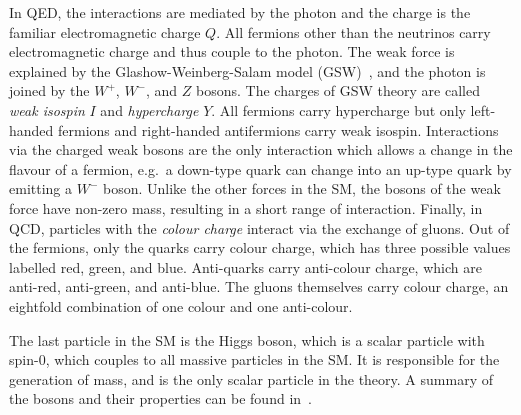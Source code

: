 In QED, the interactions are mediated by the photon and the charge is the familiar electromagnetic charge $Q$.
All fermions other than the neutrinos carry electromagnetic charge and thus couple to the photon.
The weak force is explained by the Glashow-Weinberg-Salam model (GSW)~\cite{glashow1961,weinberg1967,salam1968}, and the photon is joined by the $W^+$, $W^-$, and $Z$ bosons.
The charges of GSW theory are called \textit{weak isospin} $I$ and \textit{hypercharge} $Y$.
All fermions carry hypercharge but only left-handed fermions and right-handed antifermions carry weak isospin.
Interactions via the charged weak bosons are the only interaction which allows a change in the flavour of a fermion, e.g.\ a down-type quark can change into an up-type quark by emitting a $W^-$ boson.
Unlike the other forces in the SM, the bosons of the weak force have non-zero mass, resulting in a short range of interaction.
Finally, in QCD, particles with the \textit{colour charge} interact via the exchange of gluons.
Out of the fermions, only the quarks carry colour charge, which has three possible values labelled red, green, and blue.
Anti-quarks carry anti-colour charge, which are anti-red, anti-green, and anti-blue.
The gluons themselves carry colour charge, an eightfold combination of one colour and one anti-colour.

The last particle in the SM is the Higgs boson, which is a scalar particle with spin-0, which couples to all massive particles in the SM.
It is responsible for the generation of mass, and is the only scalar particle in the theory.
A summary of the bosons and their properties can be found in~.

